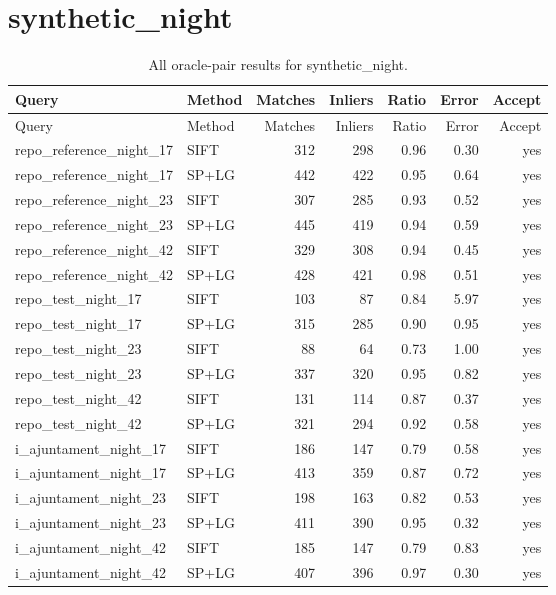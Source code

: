 \section{synthetic\_night}
\begingroup\scriptsize\setlength{\tabcolsep}{3pt}
\begin{longtable}{llrrrrr}
\caption{All oracle-pair results for synthetic\_night.}\\
\toprule
Query & Method & Matches & Inliers & Ratio & Error & Accept\\\midrule\endfirsthead
\toprule Query & Method & Matches & Inliers & Ratio & Error & Accept\\\midrule\endhead
\bottomrule\endfoot
repo\_reference\_night\_17 & SIFT & 312 & 298 & 0.96 & 0.30 & yes \\
repo\_reference\_night\_17 & SP+LG & 442 & 422 & 0.95 & 0.64 & yes \\
repo\_reference\_night\_23 & SIFT & 307 & 285 & 0.93 & 0.52 & yes \\
repo\_reference\_night\_23 & SP+LG & 445 & 419 & 0.94 & 0.59 & yes \\
repo\_reference\_night\_42 & SIFT & 329 & 308 & 0.94 & 0.45 & yes \\
repo\_reference\_night\_42 & SP+LG & 428 & 421 & 0.98 & 0.51 & yes \\
repo\_test\_night\_17 & SIFT & 103 & 87 & 0.84 & 5.97 & yes \\
repo\_test\_night\_17 & SP+LG & 315 & 285 & 0.90 & 0.95 & yes \\
repo\_test\_night\_23 & SIFT & 88 & 64 & 0.73 & 1.00 & yes \\
repo\_test\_night\_23 & SP+LG & 337 & 320 & 0.95 & 0.82 & yes \\
repo\_test\_night\_42 & SIFT & 131 & 114 & 0.87 & 0.37 & yes \\
repo\_test\_night\_42 & SP+LG & 321 & 294 & 0.92 & 0.58 & yes \\
i\_ajuntament\_night\_17 & SIFT & 186 & 147 & 0.79 & 0.58 & yes \\
i\_ajuntament\_night\_17 & SP+LG & 413 & 359 & 0.87 & 0.72 & yes \\
i\_ajuntament\_night\_23 & SIFT & 198 & 163 & 0.82 & 0.53 & yes \\
i\_ajuntament\_night\_23 & SP+LG & 411 & 390 & 0.95 & 0.32 & yes \\
i\_ajuntament\_night\_42 & SIFT & 185 & 147 & 0.79 & 0.83 & yes \\
i\_ajuntament\_night\_42 & SP+LG & 407 & 396 & 0.97 & 0.30 & yes \\

\end{longtable}
